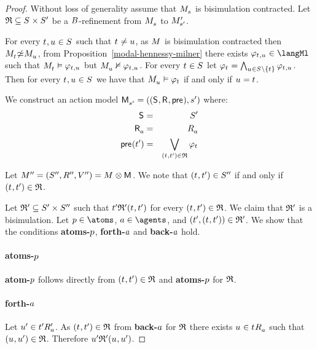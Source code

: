 \begin{proof}
Without loss of generality assume that $\kPModel{\kStateS}$ is bisimulation contracted.
Let $\refinement \subseteq \kStates \times \kStatesP$ be a $B$-refinement from $\kPModel{\kStateS}$ to ${M^{\prime}_{{s}^{\prime}}}$.

For every $\kStateT, \kStateU \in \kStates$ such that $\kStateT \neq \kStateU$, as $\kModel$ is bisimulation contracted then $\kPModel{\kStateT} \nbisimilar \kPModel{\kStateU}$, from Proposition~\ref{modal-hennessy-milner} there exists $\phi_{\kStateT, \kStateU} \in \langMl$ such that $\kPModel{\kStateT} \entails \phi_{\kStateT, \kStateU}$ but $\kPModel{\kStateU} \nentails \phi_{\kStateT, \kStateU}$.
For every $\kStateT \in \kStates$ let $\phi_{\kStateT} = \bigwedge_{\kStateU \in \kStates \setminus \{\kStateT\}} \phi_{\kStateT, \kStateU}$.
Then for every $\kStateT, \kStateU \in \kStates$ we have that $\kPModel{\kStateU} \entails \phi_{\kStateT}$ if and only if $\kStateU = \kStateT$.

We construct an action model $\aPModelAndTuple{\kStateSP}$ where:
\begin{eqnarray*}
    \aStates &=& \kStatesP\\
    \aAccessibilityA &=& \kAccessibilityA\\
    \aPrecondition(\kStateTP) &=& \bigvee_{(\kStateT, \kStateTP) \in \refinement} \phi_{\kStateT}
\end{eqnarray*}

Let $\kModelAndTuplePP = \kModel \exec \aModel$. 
We note that $(\kStateT, \kStateTP) \in \kStatesPP$ if and only if $(\kStateT, \kStateTP) \in \refinement$.

Let $\mathfrak{R}' \subseteq {S^{\prime}} \times {S^{\prime\prime}}$ such that $\kStateTP \bisimulation' (\kStateT, \kStateTP)$ for every $(\kStateT, \kStateTP) \in \refinement$.
We claim that $\mathfrak{R}'$ is a bisimulation.
Let $\atomP \in \atoms$, $\agentA \in \agents$, and $(\kStateTP, (\kStateT, \kStateTP)) \in \bisimulation'$.
We show that the conditions {\bf atoms-$p$}, {\bf forth-$a$} and {\bf back-$a$} hold.

\paragraph{atoms-$p$}
{\bf atom-$p$} follows directly from $(\kStateT, \kStateTP) \in \refinement$ and {\bf atoms-$p$} for $\mathfrak{R}$.

\paragraph{forth-$a$}
Let ${u}^{\prime} \in {{t}^{\prime}} {R^{\prime}_{a}}$.
As $(\kStateT, \kStateTP) \in \refinement$ from {\bf back-$a$} for $\mathfrak{R}$ there exists $\kStateU \in \kSuccessorsA{\kStateT}$ such that $(\kStateU, \kStateUP) \in \refinement$.
Therefore $\kStateUP \bisimulation' (\kStateU, \kStateUP)$.


\end{proof}

